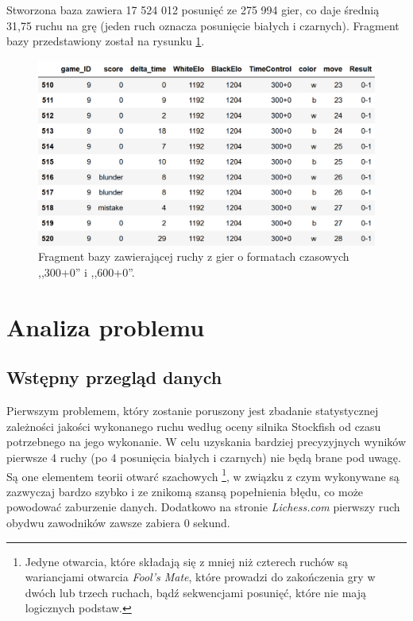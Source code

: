 \documentclass[inzynierska]{pwr_wmat_praca_dyplomowa}
\theoremstyle{plain}
\numberwithin{theorem}{chapter}
\theoremstyle{definition}
\numberwithin{theorem}{chapter}
\begin{document}
Stworzona baza zawiera 17 524 012 posunięć ze 275 994 gier, co daje średnią 31,75 ruchu na grę (jeden ruch oznacza posunięcie białych i czarnych). Fragment bazy przedstawiony został na rysunku \ref{rys:baza_ruchow}. 
\begin{figure}[H]
	\centering
	\includegraphics[width=\textwidth]{danee.png}
	\caption{Fragment bazy zawierającej ruchy z gier o formatach czasowych ,,300+0'' i ,,600+0''.}
	\label{rys:baza_ruchow}
\end{figure}




\section{Analiza problemu}

\subsection{Wstępny przegląd danych}



Pierwszym problemem, który zostanie poruszony jest zbadanie statystycznej zależności jakości wykonanego ruchu według oceny silnika Stockfish od czasu potrzebnego na jego wykonanie. W celu uzyskania bardziej precyzyjnych wyników pierwsze 4 ruchy (po 4 posunięcia białych i czarnych) nie będą brane pod uwagę. Są one elementem teorii otwarć szachowych \footnote{ Jedyne otwarcia, które składają się z mniej niż czterech ruchów są wariancjami otwarcia \textit{Fool's Mate}, które prowadzi do zakończenia gry w dwóch lub trzech ruchach, bądź sekwencjami posunięć, które nie mają logicznych podstaw.}, w związku z czym wykonywane są zazwyczaj bardzo szybko i ze znikomą szansą popełnienia błędu, co może powodować zaburzenie danych. Dodatkowo na stronie \textit{Lichess.com} pierwszy ruch obydwu zawodników zawsze zabiera 0 sekund.
\end{document}
